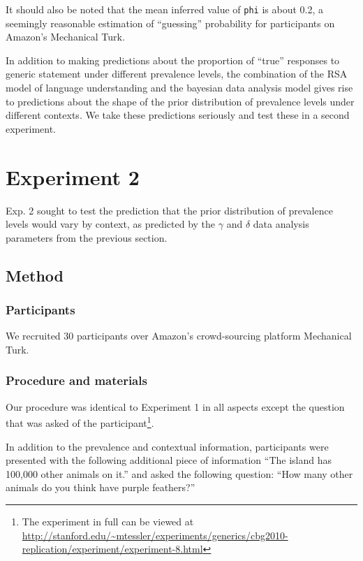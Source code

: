 \documentclass[10pt,letterpaper]{article}
\begin{document}
It should also be noted that the mean inferred value of  \lstinline{phi} is about 0.2, a seemingly reasonable estimation of ``guessing'' probability for participants on Amazon's Mechanical Turk.


In addition to making predictions about the proportion of ``true'' responses to generic statement under different prevalence levels, the combination of the RSA model of language understanding and the bayesian data analysis model gives rise to predictions about the shape of the prior distribution of prevalence levels under different contexts. We take these predictions seriously and test these in a second experiment. 

\section{Experiment 2}

Exp. 2 sought to test the prediction that the prior distribution of prevalence levels would vary by context, as predicted by the $\gamma$ and $\delta$ data analysis parameters from the previous section.

\subsection{Method}

\subsubsection{Participants}

We recruited 30 participants over Amazon's crowd-sourcing platform Mechanical Turk. 

\subsubsection{Procedure and materials}

Our procedure was identical to Experiment 1 in all aspects except the question that was asked of the participant\footnote{The experiment in full can be viewed at \url{http://stanford.edu/~mtessler/experiments/generics/cbg2010-replication/experiment/experiment-8.html}}. 

In addition to the prevalence and contextual information, participants were presented with the following additional piece of information ``The island has 100,000 other animals on it.'' and asked the following question: ``How many other animals do you think have purple feathers?''
\end{document}
